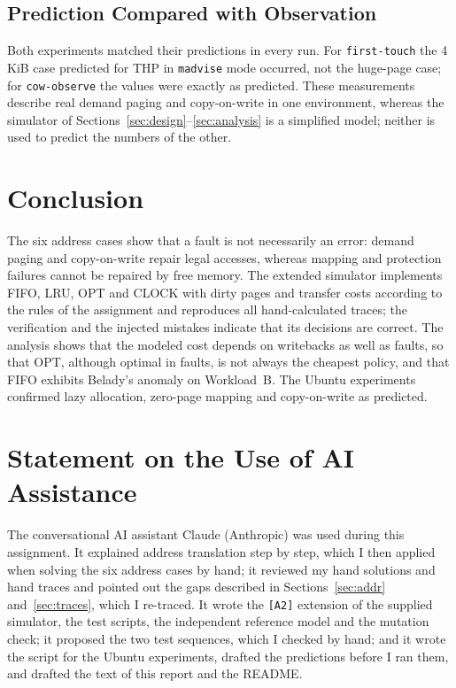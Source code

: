 \documentclass[conference,a4paper]{IEEEtran}
\newcommand{\code}[1]{\texttt{#1}}
\begin{document}
\subsection{Prediction Compared with Observation}
Both experiments matched their predictions in every run. For \code{first-touch} the 4\,KiB case predicted for THP in \code{madvise} mode occurred, not the huge-page case; for \code{cow-observe} the values were exactly as predicted. These measurements describe real demand paging and copy-on-write in one environment, whereas the simulator of Sections~\ref{sec:design}--\ref{sec:analysis} is a simplified model; neither is used to predict the numbers of the other.

\section{Conclusion}
The six address cases show that a fault is not necessarily an error: demand paging and copy-on-write repair legal accesses, whereas mapping and protection failures cannot be repaired by free memory. The extended simulator implements FIFO, LRU, OPT and CLOCK with dirty pages and transfer costs according to the rules of the assignment and reproduces all hand-calculated traces; the verification and the injected mistakes indicate that its decisions are correct. The analysis shows that the modeled cost depends on writebacks as well as faults, so that OPT, although optimal in faults, is not always the cheapest policy, and that FIFO exhibits Belady's anomaly on Workload~B. The Ubuntu experiments confirmed lazy allocation, zero-page mapping and copy-on-write as predicted.

\section*{Statement on the Use of AI Assistance}
The conversational AI assistant Claude (Anthropic) was used during this assignment. It explained address translation step by step, which I then applied when solving the six address cases by hand; it reviewed my hand solutions and hand traces and pointed out the gaps described in Sections~\ref{sec:addr} and~\ref{sec:traces}, which I re-traced. It wrote the \code{[A2]} extension of the supplied simulator, the test scripts, the independent reference model and the mutation check; it proposed the two test sequences, which I checked by hand; and it wrote the script for the Ubuntu experiments, drafted the predictions before I ran them, and drafted the text of this report and the README.
\end{document}
